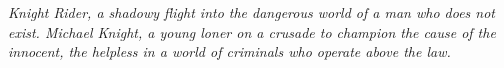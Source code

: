 %
%
\section*{}

\begin{flushright}
	{\it Knight Rider, a shadowy flight into the dangerous world of a man who does not exist. Michael Knight, a young loner on a crusade to champion the cause of the innocent, the helpless in a world of criminals who operate above the law.}
\end{flushright}
